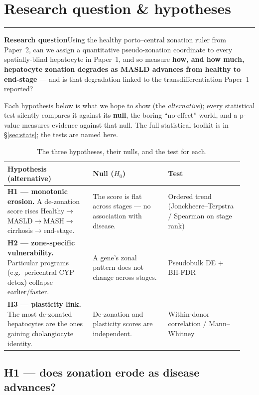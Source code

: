 \documentclass[11pt]{article}
\newcommand{\aside}[2]{\par\medskip\noindent\textcolor{teal0}{\rule{2pt}{\baselineskip}}\quad\textbf{\textcolor{teal0}{#1}}\quad #2\par\medskip}
\begin{document}
\clearpage
\section{Research question \& hypotheses}

\aside{Research question}{Using the healthy porto--central zonation ruler from Paper~2, can we assign a
quantitative pseudo-zonation coordinate to every spatially-blind hepatocyte in Paper~1, and so measure
\textbf{how, and how much, hepatocyte zonation degrades as MASLD advances from healthy to end-stage}
--- and is that degradation linked to the transdifferentiation Paper~1 reported?}

Each hypothesis below is what we hope to show (the \emph{alternative}); every statistical test silently
compares it against its \textbf{null}, the boring ``no-effect'' world, and a p-value measures evidence
against that null. The full statistical toolkit is in \S\ref{sec:stats}; the tests are named here.

\begin{table}[h]
\centering\small
\caption{The three hypotheses, their nulls, and the test for each.}
\label{tab:hyp}
\begin{tabular}{@{}p{0.34\linewidth} p{0.30\linewidth} p{0.30\linewidth}@{}}
\toprule
\textbf{Hypothesis (alternative)} & \textbf{Null ($H_0$)} & \textbf{Test}\\
\midrule
\textbf{H1 --- monotonic erosion.} A de-zonation score rises
Healthy$\to$MASLD$\to$MASH$\to$cirrhosis$\to$end-stage. & The score is flat across stages --- no
association with disease. & Ordered trend (Jonckheere--Terpstra / Spearman on stage rank)\\
\textbf{H2 --- zone-specific vulnerability.} Particular programs (e.g.\ pericentral CYP detox) collapse
earlier/faster. & A gene's zonal pattern does not change across stages. & Pseudobulk DE $+$ BH-FDR\\
\textbf{H3 --- plasticity link.} The most de-zonated hepatocytes are the ones gaining cholangiocyte
identity. & De-zonation and plasticity scores are independent. & Within-donor correlation /
Mann--Whitney\\
\bottomrule
\end{tabular}
\end{table}

\subsection{H1 --- does zonation erode as disease advances?}
\end{document}
